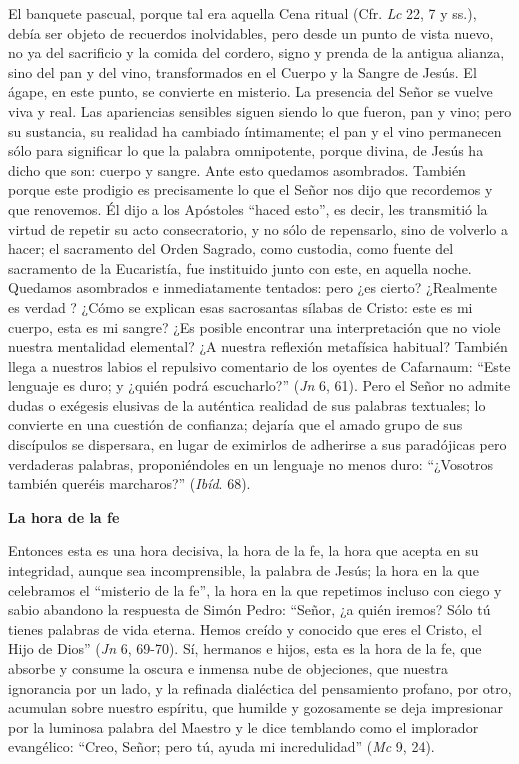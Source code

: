 			\begin{body}El banquete pascual, porque tal era aquella Cena ritual (Cfr. \textit{Lc }22, 7 y ss.), debía ser objeto de recuerdos inolvidables, pero desde un punto de vista nuevo, no ya del sacrificio y la comida del cordero, signo y prenda de la antigua alianza, sino del pan y del vino, transformados en el Cuerpo y la Sangre de Jesús. El ágape, en este punto, se convierte en misterio. La presencia del Señor se vuelve viva y real. Las apariencias sensibles siguen siendo lo que fueron, pan y vino; pero su sustancia, su realidad ha cambiado íntimamente; el pan y el vino permanecen sólo para significar lo que la palabra omnipotente, porque divina, de Jesús ha dicho que son: cuerpo y sangre. Ante esto quedamos asombrados. También porque este prodigio es precisamente lo que el Señor nos dijo que recordemos y que renovemos. Él dijo a los Apóstoles “haced esto”, es decir, les transmitió la virtud de repetir su acto consecratorio, y no sólo de repensarlo, sino de volverlo a hacer; el sacramento del Orden Sagrado, como custodia, como fuente del sacramento de la Eucaristía, fue instituido junto con este, en aquella noche. Quedamos asombrados e inmediatamente tentados: pero ¿es cierto? ¿Realmente es verdad ? ¿Cómo se explican esas sacrosantas sílabas de Cristo: este es mi cuerpo, esta es mi sangre? ¿Es posible encontrar una interpretación que no viole nuestra mentalidad elemental? ¿A nuestra reflexión metafísica habitual? También llega a nuestros labios el repulsivo comentario de los oyentes de Cafarnaum: “Este lenguaje es duro; y ¿quién podrá escucharlo?” (\textit{Jn }6, 61). Pero el Señor no admite dudas o exégesis elusivas de la auténtica realidad de sus palabras textuales; lo convierte en una cuestión de confianza; dejaría que el amado grupo de sus discípulos se dispersara, en lugar de eximirlos de adherirse a sus paradójicas pero verdaderas palabras, proponiéndoles en un lenguaje no menos duro: “¿Vosotros también queréis marcharos?” (\textit{Ibíd}. 68). \end{body}
			
			\begin{bodycenter}\textbf{La hora de la fe }\end{bodycenter}
			
			\begin{body}Entonces esta es una hora decisiva, la hora de la fe, la hora que acepta en su integridad, aunque sea incomprensible, la palabra de Jesús; la hora en la que celebramos el “misterio de la fe”, la hora en la que repetimos incluso con ciego y sabio abandono la respuesta de Simón Pedro: “Señor, ¿a quién iremos? Sólo tú tienes palabras de vida eterna. Hemos creído y conocido que eres el Cristo, el Hijo de Dios” (\textit{Jn} 6, 69-70). Sí, hermanos e hijos, esta es la hora de la fe, que absorbe y consume la oscura e inmensa nube de objeciones, que nuestra ignorancia por un lado, y la refinada dialéctica del pensamiento profano, por otro, acumulan sobre nuestro espíritu, que humilde y gozosamente se deja impresionar por la luminosa palabra del Maestro y le dice temblando como el implorador evangélico: “Creo, Señor; pero tú, ayuda mi incredulidad” (\textit{Mc }9, 24). \end{body}
			
